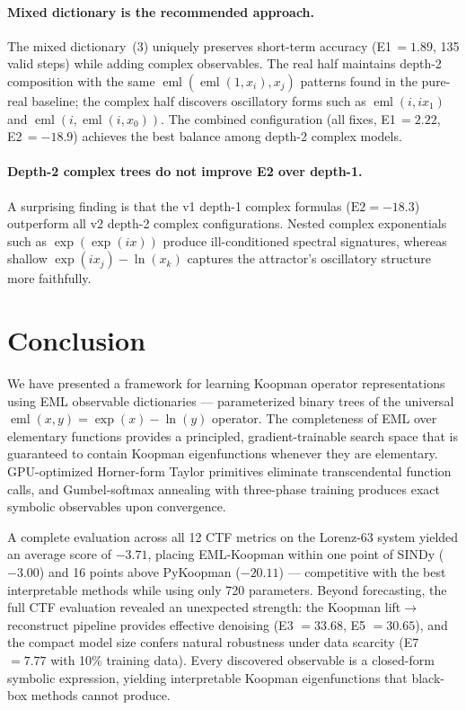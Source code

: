 \documentclass[11pt]{article}
\DeclareMathOperator{\eml}{eml}
\begin{document}
\paragraph{Mixed dictionary is the recommended approach.}
The mixed dictionary~(3) uniquely preserves short-term accuracy
(E1\,$= 1.89$, 135 valid steps) while adding complex observables.
The real half maintains depth-2 composition with the same
$\eml(\eml(1,x_i), x_j)$ patterns found in the pure-real baseline;
the complex half discovers oscillatory forms such as
$\eml(i, ix_1)$ and $\eml(i, \eml(i, x_0))$.
The combined configuration (all fixes, E1\,$= 2.22$, E2\,$= -18.9$)
achieves the best balance among depth-2 complex models.

\paragraph{Depth-2 complex trees do not improve E2 over depth-1.}
A surprising finding is that the v1 depth-1 complex formulas
($\text{E2} = -18.3$) outperform all v2 depth-2 complex configurations.
Nested complex exponentials such as $\exp(\exp(ix))$ produce
ill-conditioned spectral signatures, whereas shallow
$\exp(ix_j) - \ln(x_k)$ captures the attractor's oscillatory structure
more faithfully.


\section{Conclusion}
\label{sec:conclusion}

We have presented a framework for learning Koopman operator representations using
EML observable dictionaries --- parameterized binary trees of the universal
$\eml(x,y) = \exp(x) - \ln(y)$ operator.  The completeness of EML over elementary
functions provides a principled, gradient-trainable search space that is guaranteed
to contain Koopman eigenfunctions whenever they are elementary.  GPU-optimized
Horner-form Taylor primitives eliminate transcendental function calls, and
Gumbel-softmax annealing with three-phase training produces exact symbolic
observables upon convergence.

A complete evaluation across all 12 CTF metrics on the Lorenz-63 system yielded
an average score of $-3.71$, placing EML-Koopman within one point of SINDy
($-3.00$) and 16 points above PyKoopman ($-20.11$) --- competitive with the best
interpretable methods while using only 720 parameters.  Beyond forecasting, the
full CTF evaluation revealed an unexpected strength: the Koopman
lift$\to$reconstruct pipeline provides effective denoising (E3 $= 33.68$,
E5 $= 30.65$), and the compact model size confers natural robustness under data
scarcity (E7 $= 7.77$ with 10\% training data).  Every discovered observable is a
closed-form symbolic expression, yielding interpretable Koopman eigenfunctions that
black-box methods cannot produce.
\end{document}
